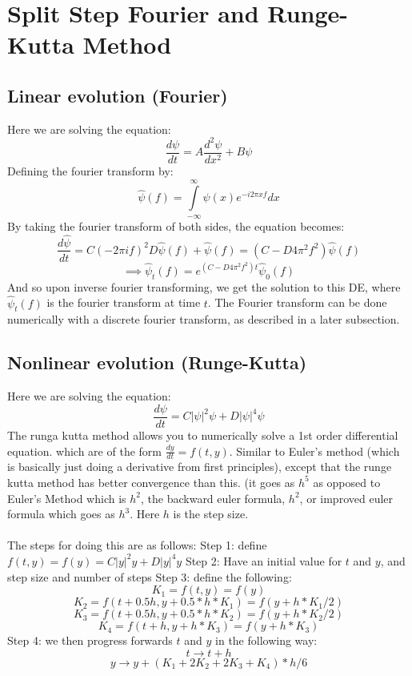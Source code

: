 \documentclass[a4paper,12pt]{report}
\begin{document}
\section{Split Step Fourier and Runge-Kutta Method}
\subsection{Linear evolution (Fourier)}
Here we are solving the equation: 
$$\frac{d\psi}{dt}=A\frac{d^2\psi}{dx^2}+B\psi$$
Defining the fourier transform by: 
$$\hat \psi(f)=\int\limits_{-\infty}^\infty \psi(x)e^{-i2\pi x f} dx$$
By taking the fourier transform of both sides, the equation becomes:\\
$$\frac{d \hat \psi}{dt}= C(-2\pi i f)^2 D\hat \psi (f)+\hat \psi(f)= (C-D4 \pi^2 f^2) \hat \psi(f)$$
$$\implies \hat \psi_t(f) = e^{(C-D4\pi^2 f^2)t}\hat \psi_0(f)$$
And so upon inverse fourier transforming, we get the solution to this DE, where $\hat \psi_t(f)$ is the fourier transform at time $t$.
The Fourier transform can be done numerically with a discrete fourier transform, as described in a later subsection.

\subsection{Nonlinear evolution (Runge-Kutta)}
Here we are solving the equation:
$$\frac{d\psi}{dt}=C|\psi|^2\psi + D|\psi|^4\psi$$
The runga kutta method allows you to numerically solve a 1st order differential equation. which are of the form $\frac{dy}{dt}=f(t,y)$. Similar to Euler's method (which is basically just doing a derivative from first principles), except that the runge kutta method has better convergence than this. (it goes as $h^5$ as opposed to Euler's Method which is $h^2$, the backward euler formula, $h^2$, or improved euler formula which goes as $h^3$. Here $h$ is the step size. 
\\\\
The steps for doing this are as follows:
Step 1: define $f(t,y)=f(y)=C|y|^2 y  +D|y|^4 y$
Step 2: Have an initial value for $t$ and $y$, and step size and number of steps
Step 3: define the following:
$$K_1 =f(t,y)=f(y)$$
$$K_2 =f(t+0.5h,y+0.5*h*K_1)=f(y+h*K_1/2)$$
$$K_3 =f(t+0.5h,y+0.5*h*K_2)=f(y+h*K_2/2)$$
$$K_4 =f(t+h,y+h*K_3)=f(y+h*K_3)$$
Step 4: we then progress forwards $t$ and $y$ in the following way:
$$t\rightarrow t+h$$
$$y\rightarrow y+(K_1+2K_2+2K_3+K_4)*h/6$$

\iffalse
\end{document}
